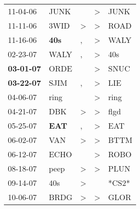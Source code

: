 \begin{supertabular}{p{0.07\textwidth}p{0.06\textwidth}p{0.02\textwidth}p{0.02\textwidth}p{0.06\textwidth}}
          11-04-06\textsuperscript{} &           JUNK\textsuperscript{} &                  &     \textgreater &           JUNK\textsuperscript{} \\
          11-11-06\textsuperscript{} &           3WID\textsuperscript{} &     \textgreater &     \textgreater &           ROAD\textsuperscript{} \\
          11-16-06\textsuperscript{} &   \textbf{40s\textsuperscript{}} &                , &     \textgreater &           WALY\textsuperscript{} \\
          02-23-07\textsuperscript{} &           WALY\textsuperscript{} &                , &     \textgreater &            40s\textsuperscript{} \\
 \textbf{03-01-07\textsuperscript{}} &           ORDE\textsuperscript{} &                  &     \textgreater &           SNUC\textsuperscript{} \\
 \textbf{03-22-07\textsuperscript{}} &           SJIM\textsuperscript{} &                , &     \textgreater &            LIE\textsuperscript{} \\
          04-06-07\textsuperscript{} &           ring\textsuperscript{} &                  &     \textgreater &           ring\textsuperscript{} \\
          04-21-07\textsuperscript{} &            DBK\textsuperscript{} &     \textgreater &     \textgreater &           flgd\textsuperscript{} \\
          05-25-07\textsuperscript{} &   \textbf{EAT\textsuperscript{}} &                , &     \textgreater &            EAT\textsuperscript{} \\
          06-02-07\textsuperscript{} &            VAN\textsuperscript{} &     \textgreater &     \textgreater &           BTTM\textsuperscript{} \\
          06-12-07\textsuperscript{} &           ECHO\textsuperscript{} &                  &     \textgreater &           ROBO\textsuperscript{} \\
          08-18-07\textsuperscript{} &           peep\textsuperscript{} &     \textgreater &     \textgreater &           PLUN\textsuperscript{} \\
          09-14-07\textsuperscript{} &            40s\textsuperscript{} &     \textgreater &                  &                            *CS2* \\
          10-06-07\textsuperscript{} &           BRDG\textsuperscript{} &     \textgreater &     \textgreater &           GLOR\textsuperscript{} \\

\end{supertabular}
